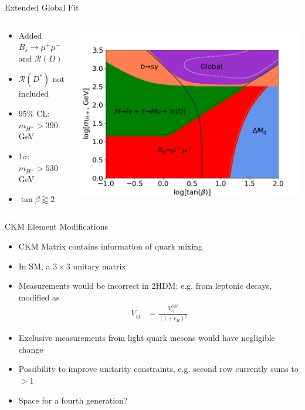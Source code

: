\documentclass[10pt,xcolor={table,dvipsnames},t]{beamer}
\begin{document}
\begin{frame}{Extended Global Fit}
    \begin{columns}[T]
        \begin{column}{0.37\textwidth}
            \vspace{1.5em}
            \begin{itemize}
                \item Added $B_s\to\mu^+\mu^-$ and $\mathcal{R}(D)$
                \item $\mathcal{R}(D^*)$ not included
                \item 95\% CL: $m_{H^+}>390\,$GeV
                \item $1\sigma$: $m_{H^+}>530\,$GeV
                \item $\tan\beta\gtrapprox2$
            \end{itemize}
        \end{column}
        \begin{column}{0.60\textwidth}
            \includegraphics[scale=0.35]{global_lines.png}
        \end{column}
    \end{columns}
\end{frame}

\begin{frame}{CKM Element Modifications}
    \begin{itemize}
        \item CKM Matrix contains information of quark mixing 
        \item In SM, a $3\times3$ unitary matrix
        \item Measurements would be incorrect in 2HDM; e.g. from leptonic decays, modified as
            \begin{align}
                V_{ij} &= \frac{V_{ij}^{SM}}{(1+r_H)^2}
            \end{align}
        \item Exclusive measurements from light quark mesons would have negligible change
        \item Possibility to improve unitarity constraints, e.g. second row currently sums to $>1$
        \item Space for a fourth generation? %
    \end{itemize}
\end{frame}
\end{document}
